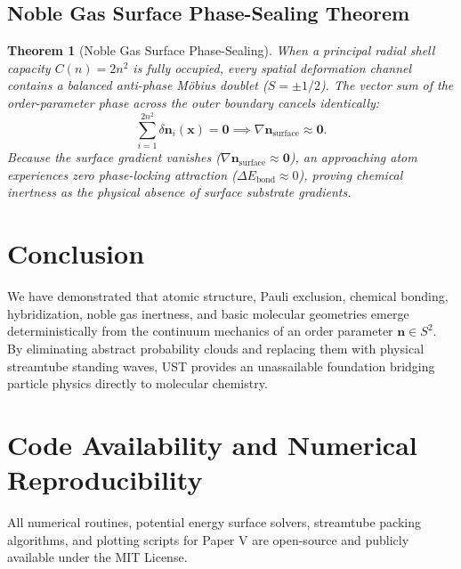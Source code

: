 \documentclass[11pt,a4paper]{article}
\newtheorem{thm}{Theorem}
\begin{document}
	\subsection{Noble Gas Surface Phase-Sealing Theorem}
	\begin{thm}[Noble Gas Surface Phase-Sealing]
		\label{thm:noble_gas_sealing}
		When a principal radial shell capacity $C(n) = 2n^2$ is fully occupied, every spatial deformation channel contains a balanced anti-phase Möbius doublet ($S = \pm 1/2$). The vector sum of the order-parameter phase across the outer boundary cancels identically:
		\begin{equation}
			\sum_{i=1}^{2n^2} \delta \mathbf{n}_i(\mathbf{x}) = \mathbf{0} \implies \nabla \mathbf{n}_{\text{surface}} \approx \mathbf{0}.
			\label{eq:noble_gas_surface_cancel}
		\end{equation}
		Because the surface gradient vanishes ($\nabla \mathbf{n}_{\text{surface}} \approx \mathbf{0}$), an approaching atom experiences zero phase-locking attraction ($\Delta E_{\text{bond}} \approx 0$), proving chemical inertness as the physical absence of surface substrate gradients.
	\end{thm}
	
	\section{Conclusion}
	\label{sec:conclusion}
	
	We have demonstrated that atomic structure, Pauli exclusion, chemical bonding, hybridization, noble gas inertness, and basic molecular geometries emerge deterministically from the continuum mechanics of an order parameter $\mathbf{n} \in S^2$. By eliminating abstract probability clouds and replacing them with physical streamtube standing waves, UST provides an unassailable foundation bridging particle physics directly to molecular chemistry.
	
	\appendix
	\section{Code Availability and Numerical Reproducibility}
	\label{app:code_availability}
	
	All numerical routines, potential energy surface solvers, streamtube packing algorithms, and plotting scripts for Paper V are open-source and publicly available under the MIT License.
	
\end{document}
